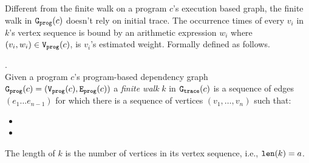 Different from the finite walk on a program $c$'s execution based graph,
the finite walk in $\mathtt{{G_{prog}}}(c)$ doesn't rely on initial trace.
The occurrence times of every $v_i $ in $k$'s vertex sequence is bound by 
an arithmetic expression $w_i$ where $(v_i, w_i) \in \mathtt{{V_{prog}}}(c)$, is $v_i$'s estimated weight. 
%
Formally defined as follows.
\begin{defn}.
  \label{def:prog_finitewalk}
  \\
  Given a program $c$'s program-based dependency graph 
  $\mathtt{{G_{prog}}}({c}) = (\mathtt{{V_{prog}}}(c), \mathtt{{E_{prog}}}(c))$
  a \emph{finite walk} $k$ in $\mathtt{{G_{trace}}}({c})$ is
  a sequence of edges $(e_1 \ldots e_{n - 1})$ 
  for which there is a sequence of vertices 
  $(v_1, \ldots, v_{n})$ such that:
  \begin{itemize}
      \item 
      \item 
  \end{itemize}
  The length of $k$ is the number of vertices in its vertex sequence, i.e., $\mathtt{len}(k) = a$.
 \end{defn}
